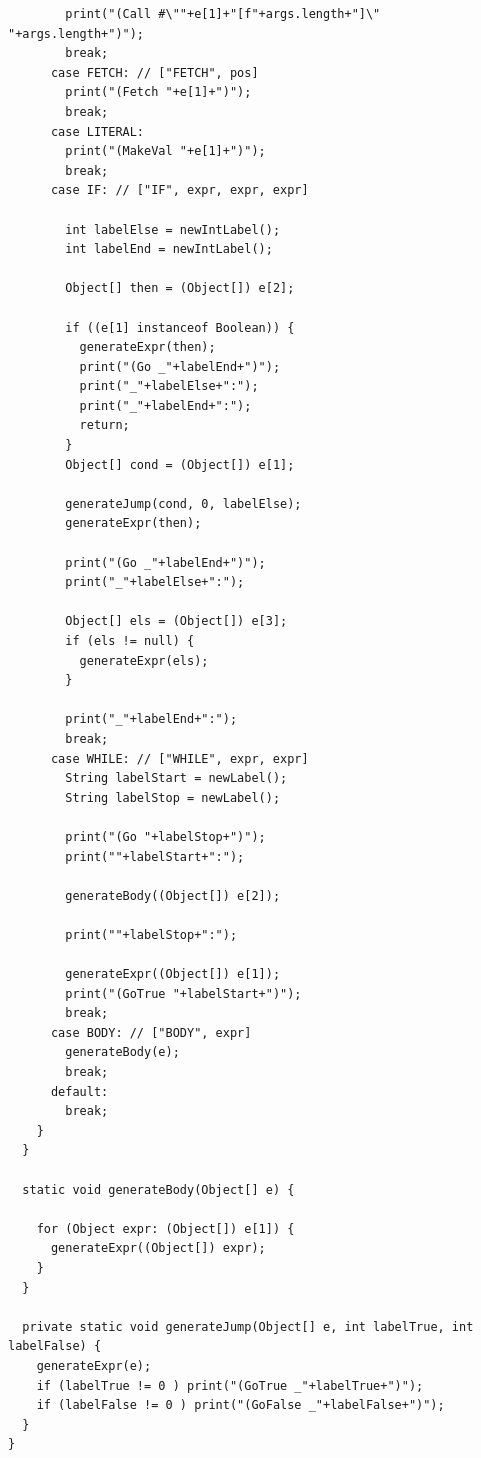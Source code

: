 \documentclass{homework}
\begin{document}
\begin{answer}
\begin{verbatim}
        print("(Call #\""+e[1]+"[f"+args.length+"]\" "+args.length+")");
        break;
      case FETCH: // ["FETCH", pos]
        print("(Fetch "+e[1]+")");
        break;
      case LITERAL:
        print("(MakeVal "+e[1]+")");
        break;
      case IF: // ["IF", expr, expr, expr]
        
        int labelElse = newIntLabel();
        int labelEnd = newIntLabel();

        Object[] then = (Object[]) e[2];

        if ((e[1] instanceof Boolean)) {
          generateExpr(then);
          print("(Go _"+labelEnd+")");
          print("_"+labelElse+":");
          print("_"+labelEnd+":");
          return;
        }
        Object[] cond = (Object[]) e[1];

        generateJump(cond, 0, labelElse);
        generateExpr(then);

        print("(Go _"+labelEnd+")");
        print("_"+labelElse+":");

        Object[] els = (Object[]) e[3];
        if (els != null) {
          generateExpr(els);
        }

        print("_"+labelEnd+":");
        break;
      case WHILE: // ["WHILE", expr, expr]
        String labelStart = newLabel();
        String labelStop = newLabel();

        print("(Go "+labelStop+")");
        print(""+labelStart+":");

        generateBody((Object[]) e[2]);

        print(""+labelStop+":");

        generateExpr((Object[]) e[1]);
        print("(GoTrue "+labelStart+")");
        break;
      case BODY: // ["BODY", expr]
        generateBody(e);
        break;
      default:
        break;
    }
  }

  static void generateBody(Object[] e) {
    
    for (Object expr: (Object[]) e[1]) {
      generateExpr((Object[]) expr);
    }
  }

  private static void generateJump(Object[] e, int labelTrue, int labelFalse) {
    generateExpr(e);
    if (labelTrue != 0 ) print("(GoTrue _"+labelTrue+")");
    if (labelFalse != 0 ) print("(GoFalse _"+labelFalse+")");
  }
}
  \end{verbatim}
\end{answer}
\end{document}
